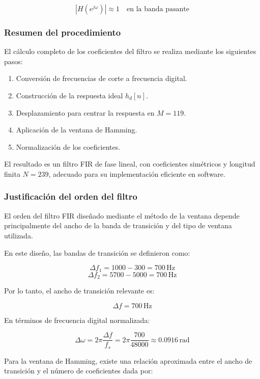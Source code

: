 \documentclass[a4,11pt]{article}
\begin{document}
\[
|H(e^{j\omega})| \approx 1 \quad \text{en la banda pasante}
\]

\subsubsection{Resumen del procedimiento}

El cálculo completo de los coeficientes del filtro se realiza mediante los siguientes pasos:

\begin{enumerate}
    \item Conversión de frecuencias de corte a frecuencia digital.
    \item Construcción de la respuesta ideal \( h_d[n] \).
    \item Desplazamiento para centrar la respuesta en \( M = 119 \).
    \item Aplicación de la ventana de Hamming.
    \item Normalización de los coeficientes.
\end{enumerate}

El resultado es un filtro FIR de fase lineal, con coeficientes simétricos y longitud finita \( N = 239 \), adecuado para su implementación eficiente en software.

\subsubsection{Justificación del orden del filtro}
\label{sec:orden_filtro}

El orden del filtro FIR diseñado mediante el método de la ventana depende principalmente del ancho de la banda de transición y del tipo de ventana utilizada.

En este diseño, las bandas de transición se definieron como:

\[
\Delta f_1 = 1000 - 300 = 700 \, \text{Hz}
\]
\[
\Delta f_2 = 5700 - 5000 = 700 \, \text{Hz}
\]

Por lo tanto, el ancho de transición relevante es:

\[
\Delta f = 700 \, \text{Hz}
\]

En términos de frecuencia digital normalizada:

\[
\Delta \omega = 2\pi \frac{\Delta f}{f_s} = 2\pi \frac{700}{48000} \approx 0.0916 \, \text{rad}
\]

Para la ventana de Hamming, existe una relación aproximada entre el ancho de transición y el número de coeficientes dada por:
\end{document}
